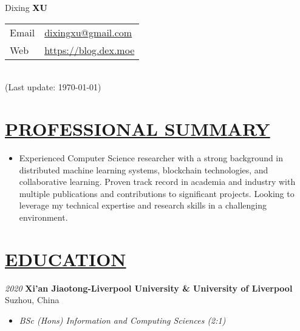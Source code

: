 \documentclass[11pt]{article}
\begin{document}
\begin{minipage}[t]{0.65\textwidth}
    {\Huge Dixing {\textbf{\textcolor{black}{XU}}}}
\end{minipage}
\begin{minipage}[t]{0.45\textwidth}
    {\small\raggedright
    \begin{tabular}{l@{: }l}
    Email & \href{mailto:dixingxu@gmail.com}{dixingxu@gmail.com} \\
    Web & \href{https://blog.dex.moe}{https://blog.dex.moe} \\
    \end{tabular}\\
    (Last update: \today)
    }
\end{minipage}

\vspace{20mm} %

%
%
\section*{\centering\underline{PROFESSIONAL SUMMARY}}
\begin{itemize}[noitemsep, nolistsep]
    \item[] Experienced Computer Science researcher with a strong background in distributed machine learning systems, blockchain technologies, and collaborative learning. Proven track record in academia and industry with multiple publications and contributions to significant projects. Looking to leverage my technical expertise and research skills in a challenging environment.
\end{itemize}
\vspace{20mm} %

%
\section*{\centering\underline{EDUCATION}}
\noindent\textit{2020} \large\textbf{Xi'an Jiaotong-Liverpool University \& University of Liverpool} \hfill Suzhou, China
\begin{itemize}[noitemsep, nolistsep]
    \item[] \textit{BSc (Hons) Information and Computing Sciences (2:1)}
\end{itemize} 
\vspace{20mm} %
\end{document}
